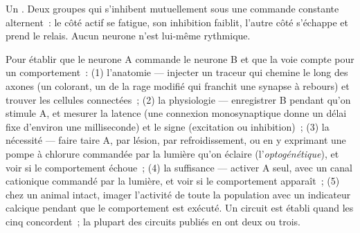 \begin{omfigure}

{\small Un . Deux groupes qui s'inhibent
mutuellement sous une commande constante alternent~: le côté actif se
fatigue, son inhibition faiblit, l'autre côté s'échappe et prend le
relais. Aucun neurone n'est lui-même rythmique.}
\end{omfigure}

\begin{method}\label{met:b3:nervous-systems:tracing}
Pour établir que le neurone A commande le neurone B et que la voie
compte pour un comportement~: (1) l'anatomie --- injecter un traceur qui
chemine le long des axones (un colorant, un  de la rage modifié qui
franchit une synapse à rebours) et trouver les cellules connectées~; (2)
la physiologie --- enregistrer B pendant qu'on stimule A, et mesurer la
latence (une connexion monosynaptique donne un délai fixe d'environ une
milliseconde) et le signe (excitation ou inhibition)~; (3) la nécessité
--- faire taire A, par lésion, par refroidissement, ou en y exprimant
une pompe à chlorure commandée par la lumière qu'on éclaire
(l'\emph{optogénétique}), et voir si le comportement échoue~; (4) la
suffisance --- activer A seul, avec un canal cationique commandé par la
lumière, et voir si le comportement apparaît~; (5) chez un animal
intact, imager l'activité de toute la population avec un indicateur
calcique pendant que le comportement est exécuté. Un circuit est établi
quand les cinq concordent~; la plupart des circuits publiés en ont deux
ou trois.
\end{method}


